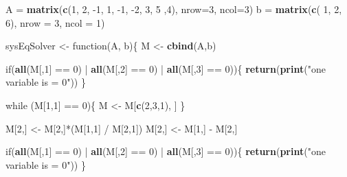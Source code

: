 \documentclass[]{article}
\newenvironment{Shaded}{\begin{snugshade}}{\end{snugshade}}
\newcommand{\KeywordTok}[1]{\textcolor[rgb]{0.13,0.29,0.53}{\textbf{{#1}}}}
\newcommand{\DataTypeTok}[1]{\textcolor[rgb]{0.13,0.29,0.53}{{#1}}}
\newcommand{\DecValTok}[1]{\textcolor[rgb]{0.00,0.00,0.81}{{#1}}}
\newcommand{\StringTok}[1]{\textcolor[rgb]{0.31,0.60,0.02}{{#1}}}
\newcommand{\NormalTok}[1]{{#1}}
\begin{document}
\begin{Shaded}
\begin{Highlighting}[]
\NormalTok{A =}\StringTok{ }\KeywordTok{matrix}\NormalTok{(}\KeywordTok{c}\NormalTok{(}\DecValTok{1}\NormalTok{, }\DecValTok{2}\NormalTok{, -}\DecValTok{1}\NormalTok{, }\DecValTok{1}\NormalTok{, -}\DecValTok{1}\NormalTok{, -}\DecValTok{2}\NormalTok{, }\DecValTok{3}\NormalTok{, }\DecValTok{5} \NormalTok{,}\DecValTok{4}\NormalTok{), }\DataTypeTok{nrow=}\DecValTok{3}\NormalTok{,  }\DataTypeTok{ncol=}\DecValTok{3}\NormalTok{) }
\NormalTok{b =}\StringTok{ }\KeywordTok{matrix}\NormalTok{(}\KeywordTok{c}\NormalTok{( }\DecValTok{1}\NormalTok{, }\DecValTok{2}\NormalTok{, }\DecValTok{6}\NormalTok{), }\DataTypeTok{nrow =} \DecValTok{3}\NormalTok{, }\DataTypeTok{ncol =} \DecValTok{1}\NormalTok{)}

\NormalTok{sysEqSolver <-}\StringTok{ }\NormalTok{function(A, b)\{}
      \NormalTok{M <-}\StringTok{ }\KeywordTok{cbind}\NormalTok{(A,b)}
      
      \NormalTok{if(}\KeywordTok{all}\NormalTok{(M[,}\DecValTok{1}\NormalTok{] ==}\StringTok{ }\DecValTok{0}\NormalTok{) |}\StringTok{ }\KeywordTok{all}\NormalTok{(M[,}\DecValTok{2}\NormalTok{] ==}\StringTok{ }\DecValTok{0}\NormalTok{) |}\StringTok{ }\KeywordTok{all}\NormalTok{(M[,}\DecValTok{3}\NormalTok{] ==}\StringTok{ }\DecValTok{0}\NormalTok{))\{}
        \KeywordTok{return}\NormalTok{(}\KeywordTok{print}\NormalTok{(}\StringTok{"one variable is = 0"}\NormalTok{))}
      \NormalTok{\}}
      
      \NormalTok{while (M[}\DecValTok{1}\NormalTok{,}\DecValTok{1}\NormalTok{] ==}\StringTok{ }\DecValTok{0}\NormalTok{)\{}
        \NormalTok{M <-}\StringTok{ }\NormalTok{M[}\KeywordTok{c}\NormalTok{(}\DecValTok{2}\NormalTok{,}\DecValTok{3}\NormalTok{,}\DecValTok{1}\NormalTok{), ]}
      \NormalTok{\}}
      
        \NormalTok{M[}\DecValTok{2}\NormalTok{,] <-}\StringTok{ }\NormalTok{M[}\DecValTok{2}\NormalTok{,]*(M[}\DecValTok{1}\NormalTok{,}\DecValTok{1}\NormalTok{] /}\StringTok{ }\NormalTok{M[}\DecValTok{2}\NormalTok{,}\DecValTok{1}\NormalTok{]) }
        \NormalTok{M[}\DecValTok{2}\NormalTok{,] <-}\StringTok{ }\NormalTok{M[}\DecValTok{1}\NormalTok{,] -}\StringTok{ }\NormalTok{M[}\DecValTok{2}\NormalTok{,]}

      \NormalTok{if(}\KeywordTok{all}\NormalTok{(M[,}\DecValTok{1}\NormalTok{] ==}\StringTok{ }\DecValTok{0}\NormalTok{) |}\StringTok{ }\KeywordTok{all}\NormalTok{(M[,}\DecValTok{2}\NormalTok{] ==}\StringTok{ }\DecValTok{0}\NormalTok{) |}\StringTok{ }\KeywordTok{all}\NormalTok{(M[,}\DecValTok{3}\NormalTok{] ==}\StringTok{ }\DecValTok{0}\NormalTok{))\{}
        \KeywordTok{return}\NormalTok{(}\KeywordTok{print}\NormalTok{(}\StringTok{"one variable is = 0"}\NormalTok{))}
      \NormalTok{\}}
        

\end{Highlighting}
\end{Shaded}
\end{document}
